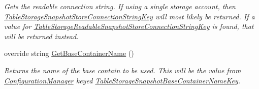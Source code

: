 \begin{DoxyCompactItemize}
\begin{DoxyCompactList}\small\item\em Gets the readable connection string. If using a single storage account, then \hyperlink{classCqrs_1_1Azure_1_1BlobStorage_1_1Events_1_1TableStorageSnapshotStoreConnectionStringFactory_aeb34e21116be39f3f34e5970001f3762_aeb34e21116be39f3f34e5970001f3762}{Table\+Storage\+Snapshot\+Store\+Connection\+String\+Key} will most likely be returned. If a value for \hyperlink{classCqrs_1_1Azure_1_1BlobStorage_1_1Events_1_1TableStorageSnapshotStoreConnectionStringFactory_add2ff350d26fed88d8c18737d3895663_add2ff350d26fed88d8c18737d3895663}{Table\+Storage\+Readable\+Snapshot\+Store\+Connection\+String\+Key} is found, that will be returned instead. \end{DoxyCompactList}\item 
override string \hyperlink{classCqrs_1_1Azure_1_1BlobStorage_1_1Events_1_1TableStorageSnapshotStoreConnectionStringFactory_af0ddf382c977759aa45d3971fb21cbed_af0ddf382c977759aa45d3971fb21cbed}{Get\+Base\+Container\+Name} ()
\begin{DoxyCompactList}\small\item\em Returns the name of the base contain to be used. This will be the value from \hyperlink{namespaceCqrs_1_1Azure_1_1ConfigurationManager}{Configuration\+Manager} keyed \hyperlink{classCqrs_1_1Azure_1_1BlobStorage_1_1Events_1_1TableStorageSnapshotStoreConnectionStringFactory_a7bfe58a97886ad7832d5640b626c1ee5_a7bfe58a97886ad7832d5640b626c1ee5}{Table\+Storage\+Snapshot\+Base\+Container\+Name\+Key}. \end{DoxyCompactList}\end{DoxyCompactItemize}
